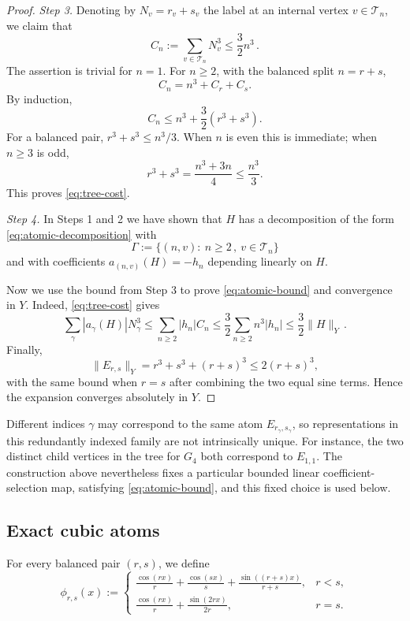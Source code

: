 \documentclass[10pt,a4paper]{amsart}
\begin{document}
\begin{proof}
\medskip

\emph{Step 3.}
Denoting by $N_v=r_v+s_v$ the label at an internal vertex $v\in\mathcal T_n$, we claim that
\begin{equation}\label{eq:tree-cost}
 C_n:=\sum_{v\in\mathcal T_n}N_v^3 \leq\frac32n^3 \,.
\end{equation}
The assertion is trivial for $n=1$.  For $n\geq2$, with the balanced split $n=r+s$,
\[
 C_n=n^3+C_r+C_s.
\]
By induction,
\[
 C_n\leq n^3+\frac32(r^3+s^3).
\]
For a balanced pair, $r^3+s^3\leq n^3/3$.  When $n$ is even this is immediate; when $n\geq3$ is odd,
\[
 r^3+s^3=\frac{n^3+3n}{4}\leq\frac{n^3}{3}.
\]
This proves \eqref{eq:tree-cost}.

\medskip

\emph{Step 4.}
In Steps 1 and 2 we have shown that $H$ has a decomposition of the form \eqref{eq:atomic-decomposition} with 
$$
\Gamma:=\{ (n,v) :\ n\geq 2 \,,\ v\in\mathcal T_n \}
$$
and with coefficients $a_{(n,v)}(H)= - h_n$ depending linearly on $H$.

Now we use the bound from Step 3 to prove \eqref{eq:atomic-bound} and convergence in $Y$. Indeed, \eqref{eq:tree-cost} gives
\[
 \sum_\gamma|a_\gamma(H)|N_\gamma^3
 \leq\sum_{n\geq2}|h_n|C_n
 \leq\frac32\sum_{n\geq2}n^3|h_n| \leq \frac32 \|H\|_Y \,.
\]
Finally,
\begin{equation}
    \label{eq:normers}
    \|E_{r,s}\|_Y=r^3+s^3+(r+s)^3\leq2(r+s)^3,
\end{equation}
with the same bound when $r=s$ after combining the two equal sine terms.  Hence the expansion converges absolutely in $Y$.
\end{proof}

Different indices $\gamma$ may correspond to the same atom $E_{r_\gamma,s_\gamma}$, so representations in this redundantly indexed family are not intrinsically unique. For instance, the two distinct child vertices in the tree for $G_4$ both correspond to $E_{1,1}$. The construction above nevertheless fixes a particular bounded linear coefficient-selection map, satisfying \eqref{eq:atomic-bound}, and this fixed choice is used below.


\subsection{Exact cubic atoms}

For every balanced pair $(r,s)$, we define
\begin{equation}\label{eq:phi-rs}
 \phi_{r,s}(x):=
 \begin{cases}
 \displaystyle
 \frac{\cos(rx)}{r}+\frac{\cos(sx)}{s}
 +\frac{\sin((r+s)x)}{r+s},&r<s,\\[2.2ex]
 \displaystyle
 \frac{\cos(rx)}{r}+\frac{\sin(2rx)}{2r},&r=s.
 \end{cases}
\end{equation}
\end{document}
